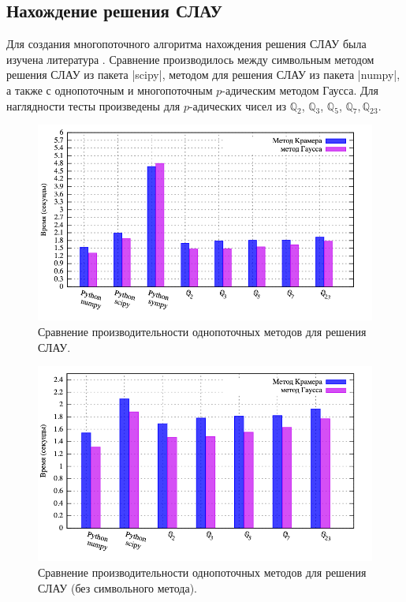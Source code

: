 \documentclass[master, och, times, nir]{sty/SCWorks}
\begin{document}
\subsection{Нахождение решения СЛАУ}

Для создания многопоточного алгоритма нахождения решения СЛАУ была изучена литература \cite{bib:analysis:anashin:3, bib:numbers:krishnamurthy, bib:number:theory, bib:numbers:voevodin}.
Сравнение производилось между символьным методом решения СЛАУ из пакета |scipy|, методом для решения СЛАУ из пакета |numpy|, а также с однопоточным и многопоточным $p$-адическим методом Гаусса. Для наглядности тесты  произведены для $p$-адических чисел из $\mathbb{Q}_2$, $\mathbb{Q}_3$, $\mathbb{Q}_5$, $\mathbb{Q}_7, \mathbb{Q}_{23}$.

\begin{figure}[H]
\centerline{\includegraphics[width=0.85\linewidth]{../gnuplot/single/system/plot.png}}
\caption{Сравнение производительности однопоточных методов для решения СЛАУ.}
\label{img:single:system:1}
\end{figure}

\begin{figure}[H]
\centerline{\includegraphics[width=0.85\linewidth]{../gnuplot/single/system/wosymb.png}}
\caption{Сравнение производительности однопоточных методов для решения СЛАУ (без символьного метода).}
\label{img:single:system:2}
\end{figure}
\end{document}
